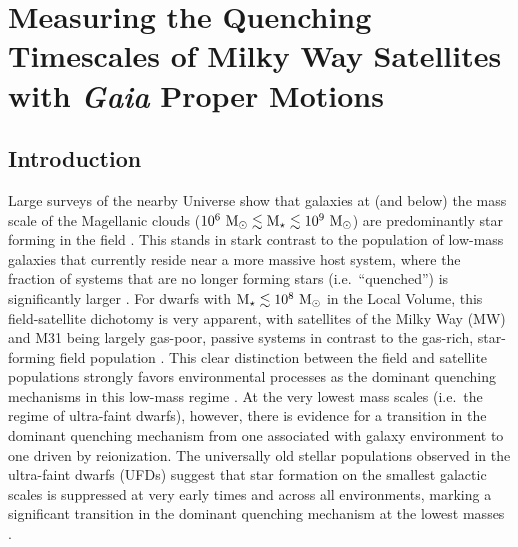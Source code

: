 

\chapter{Measuring the Quenching Timescales of Milky Way Satellites with \emph
  {Gaia} Proper Motions}





\section{Introduction}
\label{sec:intro} 


Large surveys of the nearby Universe show that galaxies at (and below) the mass
scale of the Magellanic clouds
($10^{6}~{\rm M}_{\odot} \lesssim {\rm M}_{\star} \lesssim 10^{9}~{\rm M}_{\odot}$) are predominantly star
forming in the field \citep{haines08, geha12}.
%
This stands in stark contrast to the population of low-mass galaxies that
currently reside near a more massive host system, where the fraction of systems
that are no longer forming stars (i.e.~``quenched'') is significantly larger 
\citep{geha12, wheeler14, phillips15a}.
%
For dwarfs with $\mstar \lesssim 10^{8}~\msun$ in the Local Volume, this
field-satellite dichotomy is very apparent, with satellites of the Milky Way
(MW) and M31 being largely gas-poor, passive systems in contrast to the
gas-rich, star-forming field population \citep[e.g.][]{mateo98, grcevich09,
  spekkens14}.
%
This clear distinction between the field and satellite populations strongly
favors environmental processes as the dominant quenching mechanisms in this
low-mass regime \citep[$\mstar \lesssim 10^{8}~\msun$,][]{lin83, slater14,
  weisz15, wetzel15b, fham15, fham16, fham18}.
%
At the very lowest mass scales (i.e.~the regime of ultra-faint dwarfs), however,
there is evidence for a transition in the dominant quenching mechanism from one
associated with galaxy environment to one driven by reionization. 
%
The universally old stellar populations observed in the ultra-faint dwarfs
(UFDs) suggest that star formation on the smallest galactic scales is suppressed
at very early times and across all environments, marking a significant
transition in the dominant quenching mechanism at the lowest masses
\citep{brown14, wimberly19}.
%



